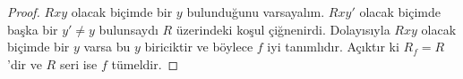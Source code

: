\documentclass[../../../include/open-logic-section]{subfiles}
\begin{document}
\begin{proof}
$Rxy$ olacak biçimde bir $y$ bulunduğunu varsayalım. $Rxy'$ olacak biçimde
başka bir $y'\neq y$ bulunsaydı $R$ üzerindeki koşul çiğnenirdi. Dolayısıyla
$Rxy$ olacak biçimde bir $y$ varsa bu $y$ biriciktir ve böylece $f$ iyi
tanımlıdır. Açıktır ki $R_f=R$'dir ve $R$ seri ise $f$ tümeldir.
\end{proof}
\end{document}

